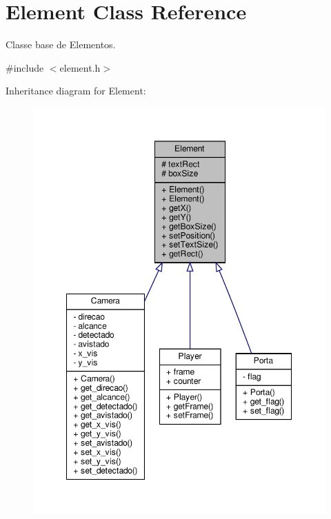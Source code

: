 \hypertarget{classElement}{}\section{Element Class Reference}
\label{classElement}


Classe base de Elementos.  




{\ttfamily \#include $<$element.\+h$>$}



Inheritance diagram for Element\+:
\nopagebreak
\begin{figure}[H]
\begin{center}
\leavevmode
\includegraphics[width=349pt]{classElement__inherit__graph}
\end{center}
\end{figure}



